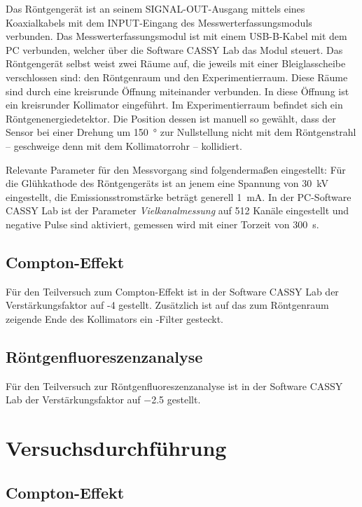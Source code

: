 \documentclass[ngerman]{scrartcl}
\begin{document}
Das Röntgengerät ist an seinem SIGNAL-OUT-Ausgang mittels eines Koaxialkabels mit dem INPUT-Eingang des Messwerterfassungsmoduls verbunden. Das Messwerterfassungsmodul ist mit einem USB-B-Kabel mit dem PC verbunden, welcher über die Software CASSY Lab das Modul steuert. Das Röntgengerät selbst weist zwei Räume auf, die jeweils mit einer Bleiglasscheibe verschlossen sind: den Röntgenraum und den Experimentierraum. Diese Räume sind durch eine kreisrunde Öffnung miteinander verbunden. In diese Öffnung ist ein kreisrunder Kollimator eingeführt. Im Experimentierraum befindet sich ein Röntgenenergiedetektor. Die Position dessen ist manuell so gewählt, dass der Sensor bei einer Drehung um \SI{150}{\degree} zur Nullstellung nicht mit dem Röntgenstrahl -- geschweige denn mit dem Kollimatorrohr -- kollidiert.

Relevante Parameter für den Messvorgang sind folgendermaßen eingestellt: Für die Glühkathode des Röntgengeräts ist an jenem eine Spannung von \SI{30}{kV} eingestellt, die Emissionsstromstärke beträgt generell \SI{1}{mA}. In der PC-Software CASSY Lab ist der Parameter \textit{Vielkanalmessung} auf 512 Kanäle eingestellt und negative Pulse sind aktiviert, gemessen wird mit einer Torzeit von \SI{300}{s}.


\subsection{Compton-Effekt}
\label{subsec:aufbau_compton}

Für den Teilversuch zum Compton-Effekt ist in der Software CASSY Lab der Verstärkungsfaktor auf -4 gestellt. Zusätzlich ist auf das zum Röntgenraum zeigende Ende des Kollimators ein -Filter gesteckt.


\subsection{Röntgenfluoreszenzanalyse}
\label{subsec:aufbau_fluoreszenz}

Für den Teilversuch zur Röntgenfluoreszenzanalyse ist in der Software CASSY Lab der Verstärkungsfaktor auf \num{-2.5} gestellt.



\section{Versuchsdurchführung}
\label{sec:durchfuehrung}

\subsection{Compton-Effekt}
\label{subsec:durchfuehrung_compton}
\end{document}
